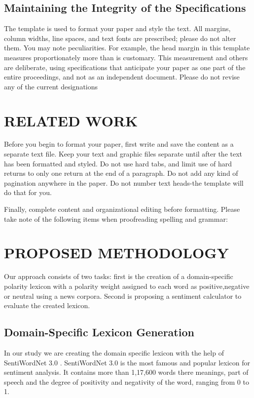 \documentclass[a4paper, 10pt, conference]{ieeeconf}      %
\begin{document}
\subsection{Maintaining the Integrity of the Specifications}

The template is used to format your paper and style the text. All margins, column widths, line spaces, and text fonts are prescribed; please do not alter them. You may note peculiarities. For example, the head margin in this template measures proportionately more than is customary. This measurement and others are deliberate, using specifications that anticipate your paper as one part of the entire proceedings, and not as an independent document. Please do not revise any of the current designations

\section{RELATED WORK}

Before you begin to format your paper, first write and save the content as a separate text file. Keep your text and graphic files separate until after the text has been formatted and styled. Do not use hard tabs, and limit use of hard returns to only one return at the end of a paragraph. Do not add any kind of pagination anywhere in the paper. Do not number text heads-the template will do that for you.

Finally, complete content and organizational editing before formatting. Please take note of the following items when proofreading spelling and grammar:

\section{PROPOSED METHODOLOGY}
Our approach consists of two tasks: first is the creation of a domain-specific polarity lexicon with a polarity weight assigned to each word as positive,negative or neutral using a news corpora. Second is proposing a sentiment calculator to evaluate the created lexicon.
\subsection{Domain-Specific Lexicon Generation}
In our study we are creating the domain specific lexicon with the help of SentiWordNet 3.0 \cite{c1}. SentiWordNet 3.0 is the most famous and popular lexicon for sentiment analysis. It contains more than 1,17,600 words  there meanings, part of speech  and the degree of positivity and negativity of the word, ranging from 0 to 1.
\end{document}
